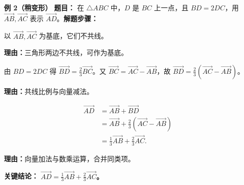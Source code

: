 \begin{examplebox}
	\medskip
	\textbf{\textcolor{CExample}{例 2（稍变形）}}
	\textbf{\textcolor{CExample}{题目：}} 在 $\triangle ABC$ 中，$D$ 是 $BC$ 上一点，且 $BD=2DC$，用 $\overrightarrow{AB},\overrightarrow{AC}$ 表示 $\overrightarrow{AD}$。\textbf{\textcolor{CExample}{解题步骤：}}
	\begin{description}[style=nextline, leftmargin=2.8em, labelsep=0.5em, itemsep=0.45em]
		\item[\textbf{第一步（选取基底）：}]
			以 $\overrightarrow{AB},\overrightarrow{AC}$ 为基底，它们不共线。
			\par\textbf{理由：}三角形两边不共线，可作为基底。
		\item[\textbf{第二步（表示$\overrightarrow{BD}$）：}]
			由 $BD=2DC$ 得 $\overrightarrow{BD}=\frac{2}{3}\overrightarrow{BC}$。又 $\overrightarrow{BC}=\overrightarrow{AC}-\overrightarrow{AB}$，故 $\overrightarrow{BD}=\frac{2}{3}(\overrightarrow{AC}-\overrightarrow{AB})$。
			\par\textbf{理由：}共线比例与向量减法。
		\item[\textbf{第三步（表达$\overrightarrow{AD}$）：}]
			\[
				\begin{aligned}
					\overrightarrow{AD}&= \overrightarrow{AB} + \overrightarrow{BD} \\&= \overrightarrow{AB} + \frac{2}{3}(\overrightarrow{AC}-\overrightarrow{AB}) \\&= \frac{1}{3}\overrightarrow{AB} + \frac{2}{3}\overrightarrow{AC}.
			\end{aligned}
			\]
			\par\textbf{理由：}向量加法与数乘运算，合并同类项。
	\end{description}
	\textbf{\textcolor{CExample}{关键结论：}}
	\textbf{$\overrightarrow{AD} = \frac{1}{3}\overrightarrow{AB} + \frac{2}{3}\overrightarrow{AC}$。}


\end{examplebox}
